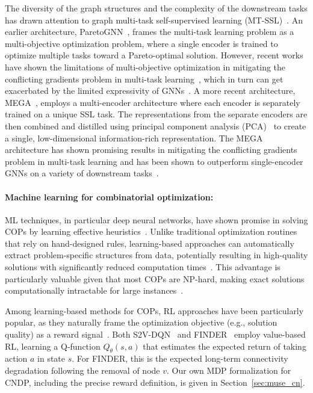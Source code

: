 \documentclass{article}
\begin{document}
The diversity of the graph structures and the complexity of the downstream tasks has drawn attention to graph multi-task self-supervised learning (MT-SSL)~\cite{ju2022multi,khoshbakhtian2024mega,jin2021automated}. An earlier architecture, ParetoGNN~\cite{xu2018powerful}, frames the multi-task learning problem as a multi-objective optimization problem, where a single encoder is trained to optimize multiple tasks toward a Pareto-optimal solution. However, recent works have shown the limitations of multi-objective optimization in mitigating the conflicting gradients problem in multi-task learning~\cite{xin2022current,kurin2022defense}, which in turn can get exacerbated by the limited expressivity of GNNs~\cite{khoshbakhtian2024mega}. A more recent architecture, MEGA~\cite{khoshbakhtian2024mega}, employs a multi-encoder architecture where each encoder is separately trained on a unique SSL task. The representations from the separate encoders are then combined and distilled using principal component analysis (PCA)~\cite{abdi2010principal} to create a single, low-dimensional information-rich representation. The MEGA architecture has shown promising results in mitigating the conflicting gradients problem in multi-task learning and has been shown to outperform single-encoder GNNs on a variety of downstream tasks~\cite{khoshbakhtian2024mega}.


\paragraph{Machine learning for combinatorial optimization:}

ML techniques, in particular deep neural networks, have shown promise in solving COPs by learning effective heuristics~\cite{bengio2021machine,cappart2021combining,cappart2023combinatorial}. Unlike traditional optimization routines that rely on hand-designed rules, learning-based approaches can automatically extract problem-specific structures from data, potentially resulting in high-quality solutions with significantly reduced computation times~\cite{khalil2017learning}. This advantage is particularly valuable given that most COPs are \mbox{NP-hard}, making exact solutions computationally intractable for large instances~\cite{karp2010reducibility}.


Among learning-based methods for COPs, RL approaches have been particularly popular, as they naturally frame the optimization objective (e.g., solution quality) as a reward signal~\cite{khalil2017learning,fan2020finding,cappart2023combinatorial}. Both S2V-DQN~\cite{khalil2017learning} and FINDER~\cite{fan2020finding} employ value-based RL, learning a Q-function $Q_\theta(s,a)$ that estimates the expected return of taking action $a$ in state $s$. For FINDER, this is the expected long-term connectivity degradation following the removal of node $v$. Our own MDP formalization for CNDP, including the precise reward definition, is given in Section~\ref{sec:muse_cn}.
\end{document}
